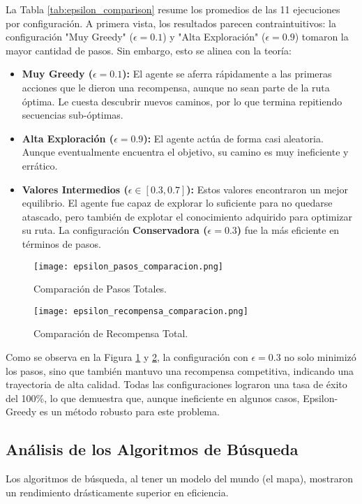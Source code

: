 \documentclass[12pt, oneside, openany]{book}
\begin{document}


La Tabla \ref{tab:epsilon_comparison} resume los promedios de las 11 ejecuciones por configuración. A primera vista, los resultados parecen contraintuitivos: la configuración "Muy Greedy" ($\epsilon=0.1$) y "Alta Exploración" ($\epsilon=0.9$) tomaron la mayor cantidad de pasos. Sin embargo, esto se alinea con la teoría:
\begin{itemize}
    \item \textbf{Muy Greedy ($\epsilon=0.1$):} El agente se aferra rápidamente a las primeras acciones que le dieron una recompensa, aunque no sean parte de la ruta óptima. Le cuesta descubrir nuevos caminos, por lo que termina repitiendo secuencias sub-óptimas.
    \item \textbf{Alta Exploración ($\epsilon=0.9$):} El agente actúa de forma casi aleatoria. Aunque eventualmente encuentra el objetivo, su camino es muy ineficiente y errático.
    \item \textbf{Valores Intermedios ($\epsilon \in [0.3, 0.7]$):} Estos valores encontraron un mejor equilibrio. El agente fue capaz de explorar lo suficiente para no quedarse atascado, pero también de explotar el conocimiento adquirido para optimizar su ruta. La configuración \textbf{Conservadora ($\epsilon=0.3$)} fue la más eficiente en términos de pasos.
\end{itemize}

\begin{figure}[H]
        \texttt{[image: epsilon\_pasos\_comparacion.png]}
        \caption{Comparación de Pasos Totales.}
        \label{fig:epsilon_pasos}
\end{figure}
\begin{figure}[H]
        \texttt{[image: epsilon\_recompensa\_comparacion.png]}
        \caption{Comparación de Recompensa Total.}
        \label{fig:epsilon_recompensa}
\end{figure}

Como se observa en la Figura \ref{fig:epsilon_pasos} y \ref{fig:epsilon_recompensa}, la configuración con $\epsilon=0.3$ no solo minimizó los pasos, sino que también mantuvo una recompensa competitiva, indicando una trayectoria de alta calidad. Todas las configuraciones lograron una tasa de éxito del 100\%, lo que demuestra que, aunque ineficiente en algunos casos, Epsilon-Greedy es un método robusto para este problema.

\subsection{Análisis de los Algoritmos de Búsqueda}
Los algoritmos de búsqueda, al tener un modelo del mundo (el mapa), mostraron un rendimiento drásticamente superior en eficiencia.
\end{document}
